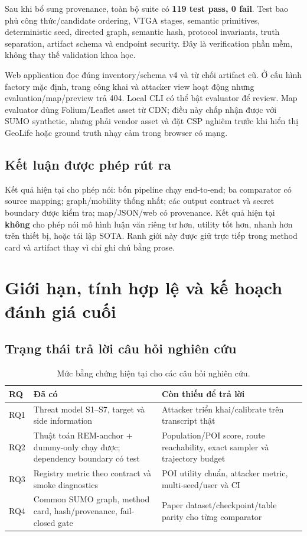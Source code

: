 \documentclass[12pt,a4paper,oneside]{report}
\begin{document}
Sau khi bổ sung provenance, toàn bộ suite có \textbf{119 test pass, 0 fail}. Test bao phủ công thức/candidate ordering, VTGA stages, semantic primitives, deterministic seed, directed graph, semantic hash, protocol invariants, truth separation, artifact schema và endpoint security. Đây là verification phần mềm, không thay thế validation khoa học.

Web application đọc đúng inventory/schema v4 và từ chối artifact cũ. Ở cấu hình factory mặc định, trang công khai và attacker view hoạt động nhưng evaluation/map/preview trả 404. Local CLI có thể bật evaluator để review. Map evaluator dùng Folium/Leaflet asset từ CDN; điều này chấp nhận được với SUMO synthetic, nhưng phải vendor asset và đặt CSP nghiêm trước khi hiển thị GeoLife hoặc ground truth nhạy cảm trong browser có mạng.

\section{Kết luận được phép rút ra}

Kết quả hiện tại cho phép nói: bốn pipeline chạy end-to-end; ba comparator có source mapping; graph/mobility thống nhất; các output contract và secret boundary được kiểm tra; map/JSON/web có provenance. Kết quả hiện tại \textbf{không} cho phép nói mô hình luận văn riêng tư hơn, utility tốt hơn, nhanh hơn trên thiết bị, hoặc tái lập SOTA. Ranh giới này được giữ trực tiếp trong method card và artifact thay vì chỉ ghi chú bằng prose.

\chapter{Giới hạn, tính hợp lệ và kế hoạch đánh giá cuối}
\label{ch:limitations}

\section{Trạng thái trả lời câu hỏi nghiên cứu}

\begin{table}[htbp]
\centering
\small
\caption{Mức bằng chứng hiện tại cho các câu hỏi nghiên cứu.}
\label{tab:rq-status}
\begin{tabularx}{\textwidth}{P{1.2cm}P{4.4cm}Y}
\toprule
\textbf{RQ} & \textbf{Đã có} & \textbf{Còn thiếu để trả lời} \\
\midrule
RQ1 & Threat model S1--S7, target và side information & Attacker triển khai/calibrate trên transcript thật \\
RQ2 & Thuật toán REM-anchor + dummy-only chạy được; dependency boundary có test & Population/POI score, route reachability, exact sampler và trajectory budget \\
RQ3 & Registry metric theo contract và smoke diagnostics & POI utility chuẩn, attacker metric, multi-seed/user và CI \\
RQ4 & Common SUMO graph, method card, hash/provenance, fail-closed gate & Paper dataset/checkpoint/table parity cho từng comparator \\
\bottomrule
\end{tabularx}
\end{table}
\end{document}
